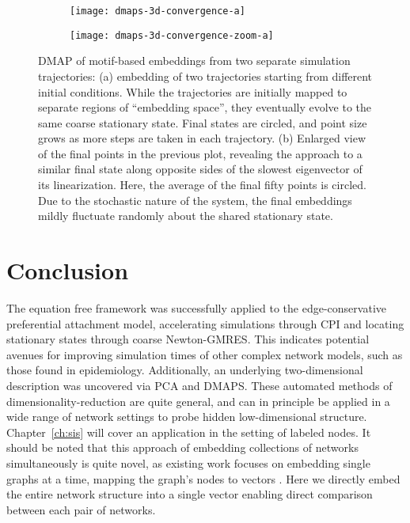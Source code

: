   \begin{figure}
    \vspace{-5mm} \centering
    \begin{subfigure}{0.49\textwidth}
      \centering
      \texttt{[image: dmaps-3d-convergence-a]}
      \subcaption{\label{fig:dmaps-results-regular}}
    \end{subfigure} %
    \begin{subfigure}{0.49\textwidth}
      \centering
      \texttt{[image: dmaps-3d-convergence-zoom-a]}
      \subcaption{\label{fig:dmaps-results-zoom}}
    \end{subfigure}%
    \caption[DMAP of motif-based embeddings when two trajectories are
    sampled]{DMAP of motif-based embeddings from two separate
      simulation trajectories: (a) embedding of two trajectories
      starting from different initial conditions. While the
      trajectories are initially mapped to separate regions of
      ``embedding space'', they eventually evolve to the same coarse
      stationary state.  Final states are circled, and point size
      grows as more steps are taken in each trajectory.  (b) Enlarged
      view of the final points in the previous plot, revealing the
      approach to a similar final state along opposite sides of the
      slowest eigenvector of its linearization.  Here, the average of
      the final fifty points is circled. Due to the stochastic nature
      of the system, the final embeddings mildly fluctuate randomly
      about the shared stationary state. \label{fig:dmaps-results}}
  \end{figure}

  \section{Conclusion}

  The equation free framework was successfully applied to the
  edge-conservative preferential attachment model, accelerating
  simulations through CPI and locating stationary states through
  coarse Newton-GMRES. This indicates potential avenues for improving
  simulation times of other complex network models, such as those
  found in epidemiology.
  Additionally, an underlying two-dimensional description was
  uncovered via PCA and DMAPS. These automated methods of
  dimensionality-reduction are quite general, and can in principle be
  applied in a wide range of network settings to probe hidden
  low-dimensional structure. Chapter~\ref{ch:sis} will cover an
  application in the setting of labeled nodes. It should be noted that
  this approach of embedding collections of networks simultaneously is
  quite novel, as existing work focuses on embedding single graphs at
  a time, mapping the graph's nodes to vectors
  \cite{tenenbaum_global_2000,belkin_laplacian_2003,tang_line:_2015}. Here
  we directly embed the entire network structure into a single vector
  enabling direct comparison between each pair of networks.

